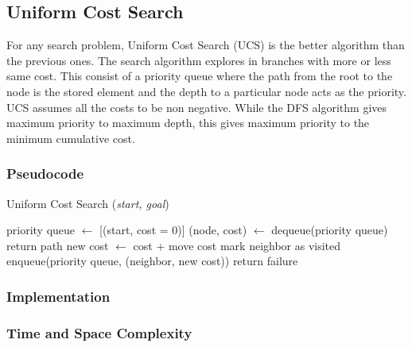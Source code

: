 \subsection{Uniform Cost Search}
\noindent For any search problem, Uniform Cost Search (UCS) is the better algorithm than the previous ones. The search algorithm explores in branches with more or less same cost. This consist of a priority queue where the path from the root to the node is the stored element and the depth to a particular node acts as the priority. UCS assumes all the costs to be non negative. While the DFS algorithm gives maximum priority to maximum depth, this gives maximum priority to the minimum cumulative cost.

\subsubsection{Pseudocode}
\begin{algorithm}[H]
	\caption{Uniform Cost Search (\textit{start, goal})}
	\label{alg:ucs}
	\begin{algorithmic}[1]
	\State priority queue $\gets$ [(start, cost = 0)]
		\State (node, cost) $\gets$ dequeue(priority queue)
			\State return path
		\EndIf
			\State new cost $\gets$ cost + move cost
				\State mark neighbor as visited
				\State enqueue(priority queue, (neighbor, new cost))
			\EndIf
		\EndFor
	\EndWhile
	\State return failure
	\end{algorithmic}
\end{algorithm}

\subsubsection{Implementation}

\subsubsection{Time and Space Complexity}

